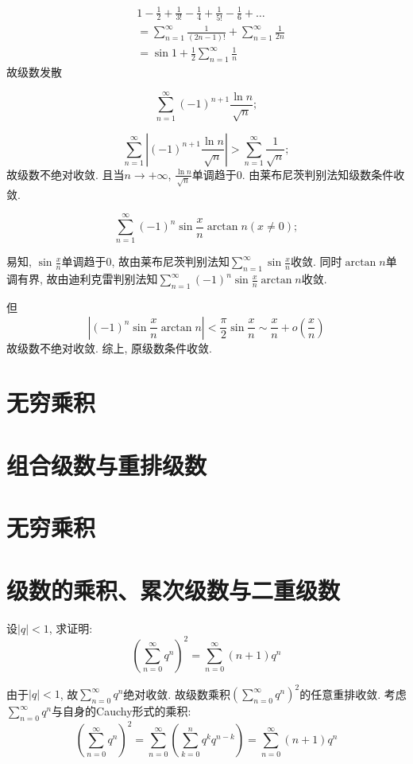 \begin{align*}
    & 1 - \frac{1}{2} + \frac{1}{3!} - \frac{1}{4} + \frac{1}{5!} -
    \frac{1}{6} + \dots
    \\
    & = \sum_{n=1}^{\infty} \frac{1}{(2n-1)!} + \sum_{n=1}^{\infty}
    \frac{1}{2n}
    \\ &= \sin 1 + \frac{1}{2} \sum_{n=1}^{\infty} \frac{1}{n}
\end{align*}
故级数发散

\[
    \sum_{n=1}^{\infty} (-1)^{n+1} \frac{\ln n}{\sqrt{n}};
\]

\[
    \sum_{n=1}^{\infty} \left| (-1)^{n+1} \frac{\ln
    n}{\sqrt{n}} \right|
    > \sum_{n=1}^{\infty} \frac{1}{\sqrt{n}} ;
\]
故级数不绝对收敛.
且当\(n \to + \infty\), \(\frac{\ln n}{\sqrt{n}}\)单调趋于0.
由莱布尼茨判别法知级数条件收敛.

\[
    \sum_{n=1}^{\infty} (-1)^n \sin \frac{x}{n} \arctan n (x \neq 0);
\]

易知, \(\sin \frac{x}{n}\)单调趋于0, 故由莱布尼茨判别法知\(\sum_{n=1}^{\infty} \sin
\frac{x}{n}\)收敛. 同时\(\arctan n\)单调有界, 故由迪利克雷判别法知\(\sum_{n=1}^{\infty}
(-1)^{n} \sin \frac{x}{n} \arctan n\)收敛.

但\[
    \left| (-1)^{n}\sin \frac{x}{n} \arctan n \right| < \frac{\pi}{2}
    \sin \frac{x}{n} \sim \frac{x}{n} + o(\frac{x}{n})
\]
故级数不绝对收敛. 综上, 原级数条件收敛.

\section{无穷乘积}
\section{组合级数与重排级数}
\section{无穷乘积}
\section{级数的乘积、累次级数与二重级数}
\begin{problem}
    设\(\left\vert q \right\vert < 1\), 求证明:
    \[
        \left( \sum_{n=0}^{\infty} q^{n} \right)^2
        =\sum_{n=0}^{\infty} (n + 1) q^{n}
    \]
\end{problem}
\begin{solution}
    由于\(\left\vert q \right\vert < 1\), 故\(\sum_{n=0}^{\infty}
    q^{n}\)绝对收敛. 故级数乘积\(\left( \sum_{n=0}^{\infty} q^{n}
    \right)^2\)的任意重排收敛.
    考虑\(\sum_{n=0}^{\infty} q^{n}\)与自身的Cauchy形式的乘积:
    \[
        \left( \sum_{n=0}^{\infty} q^{n} \right)^2
        =\sum_{n=0}^{\infty} \left( \sum_{k=0}^{n} q^{k}
        q^{n-k} \right)
        =\sum_{n=0}^{\infty} (n + 1) q^{n}
    \]
\end{solution}

